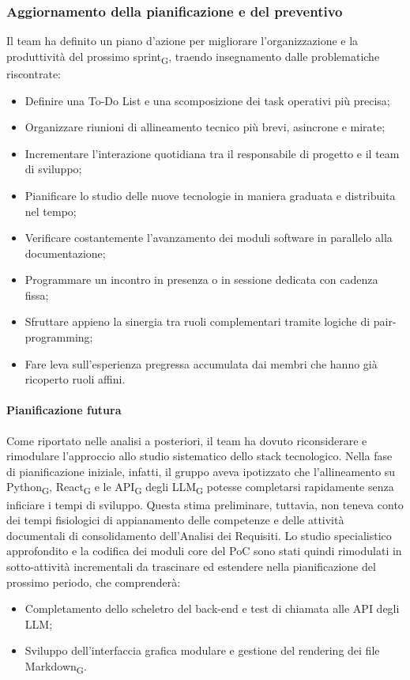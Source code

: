 \documentclass[a4paper, 10pt, colorlinks=true, linkcolor=black, urlcolor=blue, citecolor=blue, hidelinks]{article}
\begin{document}
\subsubsection{Aggiornamento della pianificazione e del preventivo}
Il team ha definito un piano d'azione per migliorare l'organizzazione e la produttività del prossimo sprint\textsubscript{G}, traendo insegnamento dalle problematiche riscontrate:
\begin{itemize}
    \item Definire una To-Do List e una scomposizione dei task operativi più precisa;
    \item Organizzare riunioni di allineamento tecnico più brevi, asincrone e mirate;
    \item Incrementare l'interazione quotidiana tra il responsabile di progetto e il team di sviluppo;
    \item Pianificare lo studio delle nuove tecnologie in maniera graduata e distribuita nel tempo;
    \item Verificare costantemente l'avanzamento dei moduli software in parallelo alla documentazione;
    \item Programmare un incontro in presenza o in sessione dedicata con cadenza fissa;
    \item Sfruttare appieno la sinergia tra ruoli complementari tramite logiche di pair-programming;
    \item Fare leva sull'esperienza pregressa accumulata dai membri che hanno già ricoperto ruoli affini.
\end{itemize}

\paragraph{Pianificazione futura}
Come riportato nelle analisi a posteriori, il team ha dovuto riconsiderare e rimodulare l'approccio allo studio sistematico dello stack tecnologico. Nella fase di pianificazione iniziale, infatti, il gruppo aveva ipotizzato che l'allineamento su Python\textsubscript{G}, React\textsubscript{G} e le API\textsubscript{G} degli LLM\textsubscript{G} potesse completarsi rapidamente senza inficiare i tempi di sviluppo. Questa stima preliminare, tuttavia, non teneva conto dei tempi fisiologici di appianamento delle competenze e delle attività documentali di consolidamento dell'Analisi dei Requisiti. Lo studio specialistico approfondito e la codifica dei moduli core del PoC sono stati quindi rimodulati in sotto-attività incrementali da trascinare ed estendere nella pianificazione del prossimo periodo, che comprenderà:
\begin{itemize}
    \item Completamento dello scheletro del back-end e test di chiamata alle API degli LLM;
    \item Sviluppo dell'interfaccia grafica modulare e gestione del rendering dei file Markdown\textsubscript{G}.
\end{itemize}
\end{document}
